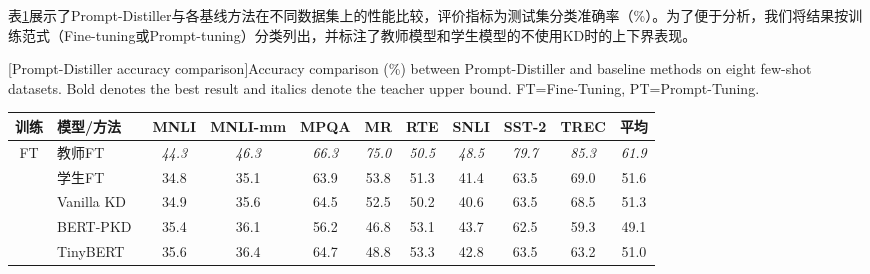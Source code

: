 \documentclass[../main.tex]{subfiles}
\begin{document}
\label{sec:ch3-5-2-overall-performance-comparison}
表\ref{tab:overall-results}展示了Prompt-Distiller与各基线方法在不同数据集上的性能比较，评价指标为测试集分类准确率（\%）。为了便于分析，我们将结果按训练范式（Fine-tuning或Prompt-tuning）分类列出，并标注了教师模型和学生模型的不使用KD时的上下界表现。

\begin{table}
	\centering
	\renewcommand{\arraystretch}{1.3}
	[Prompt-Distiller accuracy comparison]{Accuracy comparison (\%) between Prompt-Distiller and baseline methods on eight few-shot datasets. Bold denotes the best result and italics denote the teacher upper bound. FT=Fine-Tuning, PT=Prompt-Tuning.}
	\label{tab:overall-results}
	\small\begin{tabular}{c|l|*{8}{c}|c}
		\toprule[1pt]
		\textbf{训练} & \textbf{模型/方法}                                          & \textbf{MNLI} & \textbf{MNLI-mm} & \textbf{MPQA} & \textbf{MR}   & \textbf{RTE}  & \textbf{SNLI} & \textbf{SST-2} & \textbf{TREC} & \textbf{平均}   \\
		\midrule[0.5pt]
		\multirow{5}{*}{FT}
		            & 教师FT                                                    & \textit{44.3} & \textit{46.3}    & \textit{66.3} & \textit{75.0} & \textit{50.5} & \textit{48.5} & \textit{79.7}  & \textit{85.3} & \textit{61.9} \\
		            & 学生FT                                                    & 34.8          & 35.1             & 63.9          & 53.8          & 51.3          & 41.4          & 63.5           & 69.0          & 51.6          \\
		\cline{2-11}
		            & Vanilla KD~\cite{distillingknowledgeneural_hinton_2015} & 34.9          & 35.6             & 64.5          & 52.5          & 50.2          & 40.6          & 63.5           & 68.5          & 51.3          \\
		            & BERT-PKD~\cite{patientknowledgedistillation_sun_2019}   & 35.4          & 36.1             & 56.2          & 46.8          & 53.1          & 43.7          & 62.5           & 59.3          & 49.1          \\
		            & TinyBERT~\cite{tinybertdistillingbert_jiao_2020}        & 35.6          & 36.4             & 64.7          & 48.8          & 53.3          & 42.8          & 63.5           & 63.2          & 51.0          \\

\end{tabular}
\end{table}
\end{document}
